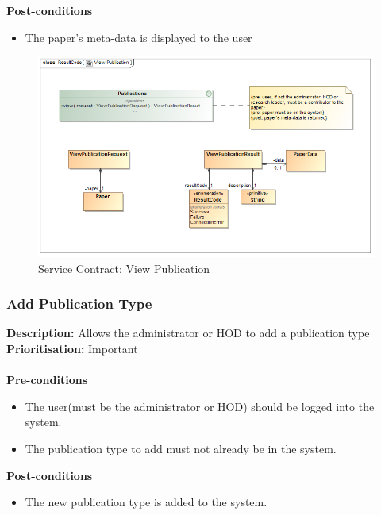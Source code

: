 \documentclass[a4paper]{article}
\begin{document}
        \textbf{Post-conditions}
        \begin{itemize}
            \item The paper's meta-data is displayed to the user
        \end{itemize}
        
                	\begin{figure}[H]
                		\centering
                		\includegraphics[width=\textwidth]{../Assignment1/5.1.7.View.Publication.Services.Contract.png}
                		\caption{Service Contract: View Publication}
                	\end{figure}
        
         \pagebreak
    \subsubsection{Add Publication Type}

        \textbf{Description:} Allows the administrator or HOD to add a publication type \\
            \textbf{Prioritisation:} Important\\
            \\
            
            
        \textbf{Pre-conditions}
         \begin{itemize}
            \item The user(must be the administrator or HOD) should be logged into the system.
            \item The publication type to add must not already be in the system.
       \end{itemize}
        
        \textbf{Post-conditions}
        \begin{itemize}
            \item The new publication type is added to the system.
        \end{itemize}
        
\end{document}
